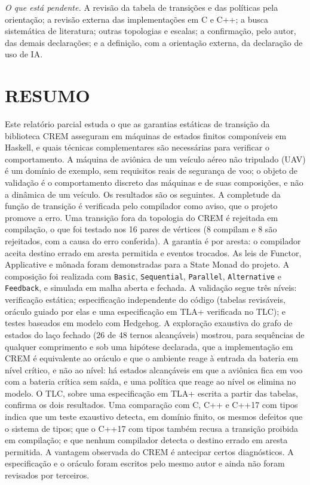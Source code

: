 \documentclass[12pt,a4paper]{article}
\begin{document}
\textit{O que está pendente.} A revisão da tabela de transições e das políticas pela orientação; a revisão externa das implementações em C e C++; a busca sistemática de literatura; outras topologias e escalas; a confirmação, pelo autor, das demais declarações; e a definição, com a orientação externa, da declaração de uso de IA.

\newpage
\section*{RESUMO}

Este relatório parcial estuda o que as garantias estáticas de transição da biblioteca CREM asseguram em máquinas de estados finitos componíveis em Haskell, e quais técnicas complementares são necessárias para verificar o comportamento. A máquina de aviônica de um veículo aéreo não tripulado (UAV) é um domínio de exemplo, sem requisitos reais de segurança de voo; o objeto de validação é o comportamento discreto das máquinas e de suas composições, e não a dinâmica de um veículo. Os resultados são os seguintes. A completude da função de transição é verificada pelo compilador como aviso, que o projeto promove a erro. Uma transição fora da topologia do CREM é rejeitada em compilação, o que foi testado nos 16 pares de vértices (8 compilam e 8 são rejeitados, com a causa do erro conferida). A garantia é por aresta: o compilador aceita destino errado em aresta permitida e eventos trocados. As leis de Functor, Applicative e mônada foram demonstradas para a State Monad do projeto. A composição foi realizada com \texttt{Basic}, \texttt{Sequential}, \texttt{Parallel}, \texttt{Alternative} e \texttt{Feedback}, e simulada em malha aberta e fechada. A validação segue três níveis: verificação estática; especificação independente do código (tabelas revisáveis, oráculo guiado por elas e uma especificação em TLA+ verificada no TLC); e testes baseados em modelo com Hedgehog. A exploração exaustiva do grafo de estados do laço fechado (26 de 48 ternos alcançáveis) mostrou, para sequências de qualquer comprimento e sob uma hipótese declarada, que a implementação em CREM é equivalente ao oráculo e que o ambiente reage à entrada da bateria em nível crítico, e não ao nível: há estados alcançáveis em que a aviônica fica em voo com a bateria crítica sem saída, e uma política que reage ao nível os elimina no modelo. O TLC, sobre uma especificação em TLA+ escrita a partir das tabelas, confirma os dois resultados. Uma comparação com C, C++ e C++17 com tipos indica que um teste exaustivo detecta, em domínio finito, os mesmos defeitos que o sistema de tipos; que o C++17 com tipos também recusa a transição proibida em compilação; e que nenhum compilador detecta o destino errado em aresta permitida. A vantagem observada do CREM é antecipar certos diagnósticos. A especificação e o oráculo foram escritos pelo mesmo autor e ainda não foram revisados por terceiros.
\end{document}
